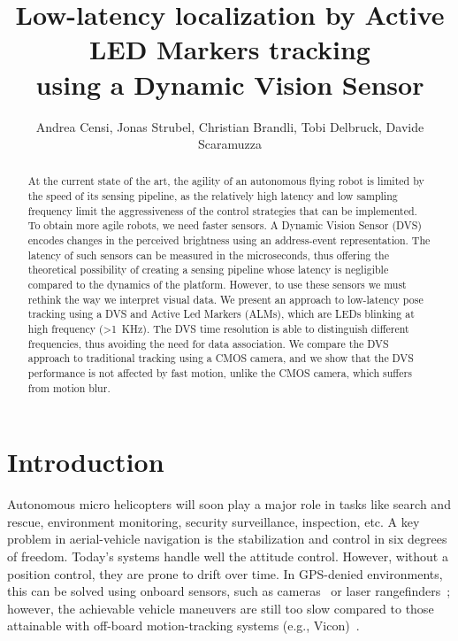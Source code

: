 
\title{\LARGE\bf Low-latency localization by Active LED Markers tracking
\\
using a Dynamic Vision Sensor}


\author{Andrea Censi\mythanks, Jonas Strubel, Christian Brandli, Tobi Delbruck,
Davide Scaramuzza}
\maketitle
\begin{abstract}
At the current state of the art, the agility of an autonomous flying
robot is limited by the speed of its sensing pipeline, as the relatively
high latency and low sampling frequency limit the aggressiveness of
the control strategies that can be implemented. To obtain more agile
robots, we need faster sensors. A Dynamic Vision Sensor (DVS) encodes
changes in the perceived brightness using an address-event representation.
The latency of such sensors can be measured in the microseconds, thus
offering the theoretical possibility of creating a sensing pipeline
whose latency is negligible compared to the dynamics of the platform.
However, to use these sensors we must rethink the way we interpret
visual data. We present an approach to low-latency pose tracking using
a DVS and Active Led Markers (ALMs), which are LEDs blinking at high
frequency (>1~KHz). The DVS time resolution is able to distinguish
different frequencies, thus avoiding the need for data association.
We compare the DVS approach to traditional tracking using a CMOS camera,
and we show that the DVS performance is not affected by fast motion,
unlike the CMOS camera, which suffers from motion blur. 
\end{abstract}

\section{Introduction}

Autonomous micro helicopters will soon play a major role in tasks
like search and rescue, environment monitoring, security surveillance,
inspection, etc. A key problem in aerial-vehicle navigation is the
stabilization and control in six degrees of freedom. Today's systems
handle well the attitude control. However, without a position control,
they are prone to drift over time. In GPS-denied environments, this
can be solved using onboard sensors, such as cameras~\cite{Weiss2011}
or laser rangefinders~\cite{Shen2011}; however, the achievable vehicle
maneuvers are still too slow compared to those attainable with off-board
motion-tracking systems (e.g., Vicon)~\cite{Lupashin2012}.

